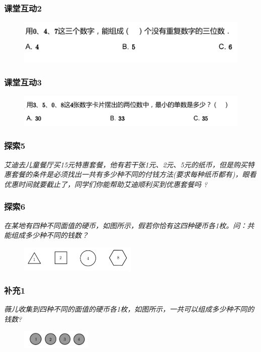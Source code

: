 \begin{frame}
    \frametitle{课堂互动2}
    \begin{figure}[H] 
        \centering
        \includegraphics[width=1\textwidth]{./pics/Chapter_2/ketanghudong2.png}
    \end{figure}
\end{frame}

\begin{frame}
    \frametitle{课堂互动3}
    \begin{figure}[H] 
        \centering
        \includegraphics[width=1\textwidth]{./pics/Chapter_2/ketanghudong3.png}
    \end{figure}
\end{frame}





\begin{frame}
    \frametitle{探索5}
    \textit{艾迪去儿童餐厅买15元特惠套餐，他有若干张1元、2元、5元的纸币，但是购买特惠套餐的条件是必须找出一共有多少种不同的付钱方法(要求每种纸币都有)，眼看优惠时间就要截止了，同学们你能帮助艾迪顺利买到优惠套餐吗 ?}
\end{frame}

\begin{frame}
    \frametitle{探索6}
    \textit{在某地有四种不同面值的硬币，如图所示，假若你恰有这四种硬币各1枚。问：共能组成多少种不同的钱数？}
    \begin{figure}[H] 
        \centering
        \includegraphics[width=0.5\textwidth]{./pics/Chapter_2/tansuo6.png}
    \end{figure}
\end{frame}

\begin{frame}
    \frametitle{补充1}
    \textit{薇儿收集到四种不同的面值的硬币各1枚，如图所示，一共可以组成多少种不同的钱数?}
    \begin{figure}[H] 
        \centering
        \includegraphics[width=0.3\textwidth]{./pics/Chapter_2/buchong1_1.png}
    \end{figure}
\end{frame}

